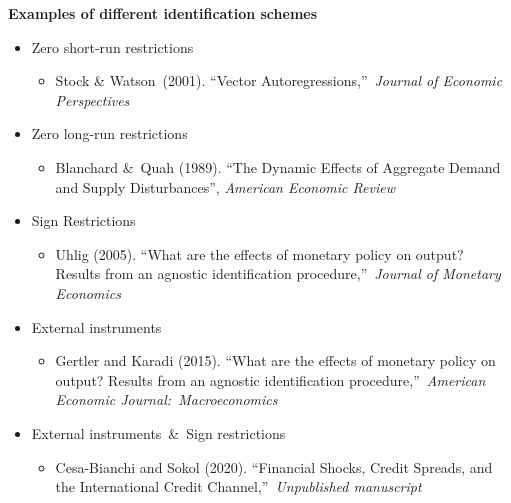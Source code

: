 \documentclass[10pt,english,t,aspectratio=169,ignorenonframetext]{beamer}
\begin{document}
\begin{frame}
{\textbf{Examples of different identification schemes}}

\begin{itemize}
\item Zero short-run restrictions

\begin{itemize}
\item Stock \& Watson\ (2001). \textquotedblleft Vector
Autoregressions,\textquotedblright\ \emph{Journal of Economic Perspectives}%
\medskip
\end{itemize}

\item Zero long-run restrictions

\begin{itemize}
\item Blanchard \&\ Quah (1989). \textquotedblleft The Dynamic Effects of
Aggregate Demand and Supply Disturbances\textquotedblright , \emph{American
Economic Review}\medskip
\end{itemize}

\item Sign Restrictions

\begin{itemize}
\item Uhlig (2005). \textquotedblleft What are the effects of monetary
policy on output? Results from an agnostic identification
procedure,\textquotedblright\ \emph{Journal of Monetary Economics}\medskip
\end{itemize}

\item External instruments

\begin{itemize}
\item Gertler and Karadi (2015). \textquotedblleft What are the effects of
monetary policy on output? Results from an agnostic identification
procedure,\textquotedblright\ \emph{American Economic Journal:\
Macroeconomics}\medskip
\end{itemize}

\item External instruments\ \&\ Sign restrictions

\begin{itemize}
\item Cesa-Bianchi and Sokol (2020). \textquotedblleft Financial Shocks,
Credit Spreads, and the International Credit Channel,\textquotedblright\ 
\emph{Unpublished manuscript}
\end{itemize}
\end{itemize}
\end{frame}
\end{document}
